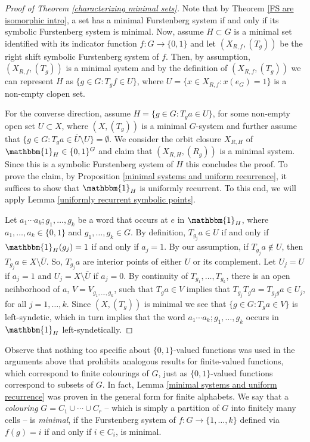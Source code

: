 \documentclass{amsart}
\numberwithin{equation}{section}
\theoremstyle{definition}
\theoremstyle{plain}
\begin{document}
\begin{proof}[Proof of Theorem \ref{characterizing minimal sets}]
Note that by Theorem \ref{FS are isomorphic intro}, a set has a minimal Furstenberg system if and only if its symbolic Furstenberg system is minimal. Now, assume $H\subset G$ is a minimal set identified with its indicator function $f:G\to \{0,1\}$ and let $(X_{R,f},(T_g))$ be the right shift symbolic Furstenberg system of $f$. Then, by assumption, $(X_{R,f},(T_g))$ is a minimal system and by the definition of $(X_{R,f},(T_g))$ we can represent $H$ as $\{g\in G: T_gf\in U\}$, where $U=\{x\in X_{R,f}: x(e_G)=1\}$ is a non-empty clopen set. 

For the converse direction, assume $H=\{g\in G: T_ga\in U\}$, for 
some non-empty open set $U\subset X$, where $(X,(T_g))$ is a 
minimal $G$-system and further assume that $\{g\in G: T_ga\in \overline{U}\setminus U\}=\emptyset$. We consider the orbit closure $X_{R,H}$ of $\mathbbm{1}_H \in \{0,1\}^G$ and claim that $(X_{R,H},(R_g))$ is a minimal system. Since this is a symbolic Furstenberg system of $H$ this concludes the proof. To prove the claim, by Proposition \ref{minimal systems and uniform recurrence}, it suffices to show that $\mathbbm{1}_H$ is uniformly recurrent. To this end, we will apply Lemma \ref{uniformly recurrent symbolic points}.

Let $a_1\cdots a_k;g_1,\dots,g_k$ be a word that occurs at $e$ in 
$\mathbbm{1}_H$, where $a_1,\dots,a_k\in \{0,1\}$ and $g_1,\ldots,g_k\in G$. By definition, $T_{g_j}a\in U$ if and only if $\mathbbm{1}_H(g_j)=1$ if and only if $a_j=1$. By our assumption, if $T_{g_j}a \notin U$, then $T_{g_j}a \in X\setminus\overline{U}$. So, $T_{g_j}a$ are interior points of either $U$ or its complement. Let $U_j=U$ if $a_j=1$ and $U_j=X\setminus\overline{U}$ if $a_j=0$.
By continuity of $T_{g_1},\ldots,T_{g_k}$, there is an open neihborhood of $a$, $V=V_{g_1,\ldots,g_k}$, such that $T_ga\in V$ implies that $T_{g_j}T_ga=T_{g_jg}a\in U_j$, for all $j=1,\ldots,k$. Since $(X,(T_g))$ is minimal we see that $\{g\in G: T_ga\in V\}$ is 
left-syndetic, which in turn implies that the word $a_1\cdots a_k;g_1,\ldots,g_k$ occurs in $\mathbbm{1}_H$ 
left-syndetically.   
\end{proof}


Observe that nothing too specific about $\{0,1\}$-valued 
functions  was used 
in the arguments above that prohibits analogous results for finite-valued 
functions, which correspond to finite colourings of $G$, just as $\{0,1\}$-valued functions correspond to subsets of $G$. In fact, Lemma 
\ref{minimal systems and uniform recurrence} was proven in the general form 
for finite alphabets. We say that a \textit{colouring} $G=C_1\cup \cdots \cup C_r$ -- which is simply a partition of $G$ into finitely many cells -- is 
\textit{minimal}, if the Furstenberg system of $f:G\to \{1,\ldots,k\}$ defined via 
$f(g)=i$ if and only if $i\in C_i$, is minimal. 
\end{document}
